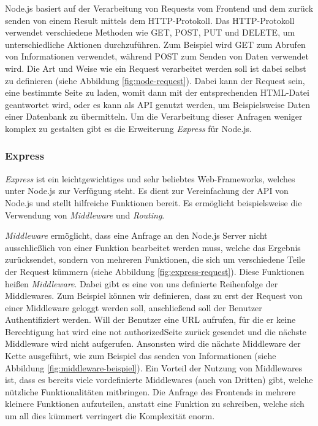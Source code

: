 \documentclass[a4paper,12pt]{report}
\newcommand{\footcite}[1]{\footnotemark\footnotetext{\cite{#1}}}
\begin{document}
Node.js basiert auf der Verarbeitung von Requests vom Frontend und dem zurück senden von einem Result mittels dem HTTP-Protokoll. Das HTTP-Protokoll verwendet verschiedene Methoden wie GET, POST, PUT und DELETE, um unterschiedliche Aktionen durchzuführen. Zum Beispiel wird GET zum Abrufen von Informationen verwendet, während POST zum Senden von Daten verwendet wird. Die Art und Weise wie ein Request verarbeitet werden soll ist dabei selbst zu definieren (siehe Abbildung \ref{fig:node-request}). Dabei kann der Request sein, eine bestimmte Seite zu laden, womit dann mit der entsprechenden HTML-Datei geantwortet wird, oder es kann als API genutzt werden, um Beispielsweise Daten einer Datenbank zu übermitteln. Um die Verarbeitung dieser Anfragen weniger komplex zu gestalten gibt es die Erweiterung \textit{Express} für Node.js.

\subsubsection{Express}
\textit{Express} ist ein leichtgewichtiges und sehr beliebtes Web-Frameworks, welches unter Node.js zur Verfügung steht. Es dient zur Vereinfachung der API von Node.js und stellt hilfreiche Funktionen bereit\footcite{expressbook}. Es ermöglicht beispielsweise die Verwendung von \textit{Middleware} und \textit{Routing}.

\textit{Middleware} ermöglicht, dass eine Anfrage an den Node.js Server nicht ausschließlich von einer Funktion bearbeitet werden muss, welche das Ergebnis zurücksendet, sondern von mehreren Funktionen, die sich um verschiedene Teile der Request kümmern (siehe Abbildung \ref{fig:express-request}). Diese Funktionen heißen \textit{Middleware}. Dabei gibt es eine von uns definierte Reihenfolge der Middlewares. Zum Beispiel können wir definieren, dass zu erst der Request von einer Middleware geloggt werden soll, anschließend soll der Benutzer Authentifiziert werden. Will der Benutzer eine URL aufrufen, für die er keine Berechtigung hat wird eine \glqq not authorized\grqq{ }Seite zurück gesendet und die nächste Middleware wird nicht aufgerufen. Ansonsten wird die nächste Middleware der Kette ausgeführt, wie zum Beispiel das senden von Informationen (siehe Abbildung \ref{fig:middleware-beispiel}). Ein Vorteil der Nutzung von Middlewares ist, dass es bereits viele vordefinierte Middlewares (auch von Dritten) gibt, welche nützliche Funktionalitäten mitbringen. Die Anfrage des Frontends in mehrere kleinere Funktionen aufzuteilen, anstatt eine Funktion zu schreiben, welche sich um all dies kümmert verringert die Komplexität enorm.
\end{document}
